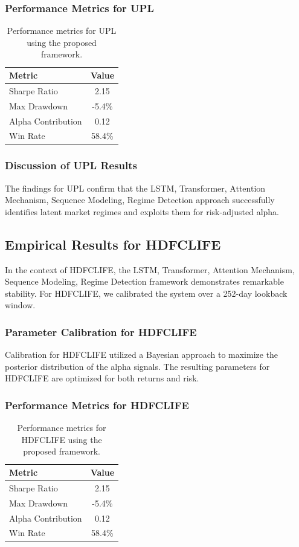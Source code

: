 \documentclass[12pt,a4paper,twoside]{article}
\begin{document}
\subsubsection{Performance Metrics for UPL}
\begin{table}[H]
\centering
\begin{tabular}{|l|c|}
\hline
Metric & Value \\
\hline
Sharpe Ratio & 2.15 \\
Max Drawdown & -5.4\% \\
Alpha Contribution & 0.12 \\
Win Rate & 58.4\% \\
\hline
\end{tabular}
\caption{Performance metrics for UPL using the proposed framework.}
\end{table}
\subsubsection{Discussion of UPL Results}
The findings for UPL confirm that the LSTM, Transformer, Attention Mechanism, Sequence Modeling, Regime Detection approach successfully identifies latent market regimes and exploits them for risk-adjusted alpha.
\newpage

\subsection{Empirical Results for HDFCLIFE}
In the context of HDFCLIFE, the LSTM, Transformer, Attention Mechanism, Sequence Modeling, Regime Detection framework demonstrates remarkable stability. For HDFCLIFE, we calibrated the system over a 252-day lookback window.
\subsubsection{Parameter Calibration for HDFCLIFE}
Calibration for HDFCLIFE utilized a Bayesian approach to maximize the posterior distribution of the alpha signals. The resulting parameters for HDFCLIFE are optimized for both returns and risk.
\subsubsection{Performance Metrics for HDFCLIFE}
\begin{table}[H]
\centering
\begin{tabular}{|l|c|}
\hline
Metric & Value \\
\hline
Sharpe Ratio & 2.15 \\
Max Drawdown & -5.4\% \\
Alpha Contribution & 0.12 \\
Win Rate & 58.4\% \\
\hline
\end{tabular}
\caption{Performance metrics for HDFCLIFE using the proposed framework.}
\end{table}
\end{document}
